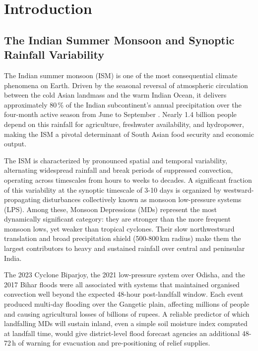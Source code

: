 \ifpdf
\graphicspath{{chapters/Figs/}{chapters/Figs/Raster/}{Figs/PDF/}{Figs/}}
\else
\graphicspath{{chapters/Figs/}{chapters/Figs/Vector/}{Figs/}}
\fi

\chapter{Introduction}
\label{ch:introduction}

\section{The Indian Summer Monsoon and Synoptic Rainfall Variability}
\label{sec:intro_ism}

The Indian summer monsoon (ISM) is one of the most consequential
climate phenomena on Earth. Driven by the seasonal reversal of
atmospheric circulation between the cold Asian landmass and the warm
Indian Ocean, it delivers approximately 80\,\% of the Indian
subcontinent's annual precipitation over the four-month active season
from June to September \autocite{ding1994monsoon}. Nearly 1.4 billion
people depend on this rainfall for agriculture, freshwater
availability, and hydropower, making the ISM a pivotal determinant of
South Asian food security and economic output.

The ISM is characterized by pronounced spatial and temporal
variability, alternating widespread rainfall and break periods
of suppressed convection, operating across timescales from hours to
weeks to decades. A significant fraction of this variability at the
synoptic timescale of 3-10 days is organized by westward-propagating
disturbances collectively known as monsoon low-pressure systems (LPS).
Among these, Monsoon Depressions (MDs) represent the most dynamically
significant category: they are stronger than the more frequent monsoon
lows, yet weaker than tropical cyclones. Their slow northwestward
translation and broad precipitation shield (500-800\,km radius) make
them the largest contributors to heavy and sustained rainfall over
central and peninsular India.

The 2023 Cyclone Biparjoy, the 2021 low-pressure system over Odisha,
and the 2017 Bihar floods were all associated with systems that
maintained organised convection well beyond the expected 48-hour
post-landfall window. Each event produced multi-day flooding over the
Gangetic plain, affecting millions of people and causing agricultural
losses of billions of rupees. A reliable predictor of which
landfalling MDs will sustain inland, even a simple soil moisture
index computed at landfall time, would give district-level flood
forecast agencies an additional 48-72\,h of warning for evacuation
and pre-positioning of relief supplies.

